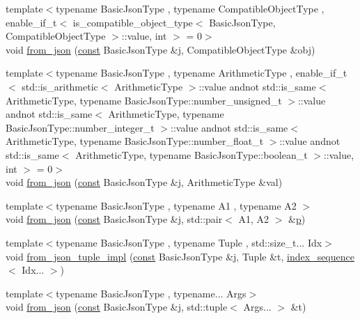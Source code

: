 \begin{DoxyCompactItemize}
\item 
{\footnotesize template$<$typename Basic\+Json\+Type , typename Compatible\+Object\+Type , enable\+\_\+if\+\_\+t$<$ is\+\_\+compatible\+\_\+object\+\_\+type$<$ Basic\+Json\+Type, Compatible\+Object\+Type $>$\+::value, int $>$  = 0$>$ }\\void \hyperlink{namespacenlohmann_1_1detail_a5e7a3674e8ac46f8feebad9712d7c55f}{from\+\_\+json} (\hyperlink{functions__c_8js_afacfd9c985d225bb07483b887a801b6f}{const} Basic\+Json\+Type \&j, Compatible\+Object\+Type \&obj)
\item 
{\footnotesize template$<$typename Basic\+Json\+Type , typename Arithmetic\+Type , enable\+\_\+if\+\_\+t$<$ std\+::is\+\_\+arithmetic$<$ Arithmetic\+Type $>$\+::value andnot std\+::is\+\_\+same$<$ Arithmetic\+Type, typename Basic\+Json\+Type\+::number\+\_\+unsigned\+\_\+t $>$\+::value andnot std\+::is\+\_\+same$<$ Arithmetic\+Type, typename Basic\+Json\+Type\+::number\+\_\+integer\+\_\+t $>$\+::value andnot std\+::is\+\_\+same$<$ Arithmetic\+Type, typename Basic\+Json\+Type\+::number\+\_\+float\+\_\+t $>$\+::value andnot std\+::is\+\_\+same$<$ Arithmetic\+Type, typename Basic\+Json\+Type\+::boolean\+\_\+t $>$\+::value, int $>$  = 0$>$ }\\void \hyperlink{namespacenlohmann_1_1detail_a839b0ab50d2c9bce669068f56bc41202}{from\+\_\+json} (\hyperlink{functions__c_8js_afacfd9c985d225bb07483b887a801b6f}{const} Basic\+Json\+Type \&j, Arithmetic\+Type \&val)
\item 
{\footnotesize template$<$typename Basic\+Json\+Type , typename A1 , typename A2 $>$ }\\void \hyperlink{namespacenlohmann_1_1detail_aae9f9c2601074e323d49428132cc293d}{from\+\_\+json} (\hyperlink{functions__c_8js_afacfd9c985d225bb07483b887a801b6f}{const} Basic\+Json\+Type \&j, std\+::pair$<$ A1, A2 $>$ \&\hyperlink{jquery_8js_a2335e57f79b6acfb6de59c235dc8a83e}{p})
\item 
{\footnotesize template$<$typename Basic\+Json\+Type , typename Tuple , std\+::size\+\_\+t... Idx$>$ }\\void \hyperlink{namespacenlohmann_1_1detail_a28253915d9db4a0112d60eaee0422949}{from\+\_\+json\+\_\+tuple\+\_\+impl} (\hyperlink{functions__c_8js_afacfd9c985d225bb07483b887a801b6f}{const} Basic\+Json\+Type \&j, Tuple \&t, \hyperlink{structnlohmann_1_1detail_1_1index__sequence}{index\+\_\+sequence}$<$ Idx... $>$)
\item 
{\footnotesize template$<$typename Basic\+Json\+Type , typename... Args$>$ }\\void \hyperlink{namespacenlohmann_1_1detail_a8b99ec9b29f3f20a18fc4281fb784e49}{from\+\_\+json} (\hyperlink{functions__c_8js_afacfd9c985d225bb07483b887a801b6f}{const} Basic\+Json\+Type \&j, std\+::tuple$<$ Args... $>$ \&t)

\end{DoxyCompactItemize}
